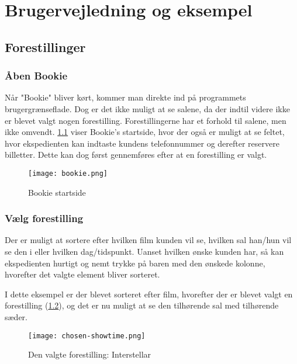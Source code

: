 \chapter{Brugervejledning og eksempel}

\section{Forestillinger}

\subsection{Åben Bookie}

Når "Bookie" bliver kørt, kommer man direkte ind på programmets brugergrænseflade. Dog er det ikke muligt at se salene, da der indtil videre ikke er blevet valgt nogen forestilling. Forestillingerne har et forhold til salene, men ikke omvendt. \ref{screenshot: bookie} viser Bookie's startside, hvor der også er muligt at se feltet, hvor ekspedienten kan indtaste kundens telefonnummer og derefter reservere billetter. Dette kan dog først gennemføres efter at en forestilling er valgt. 

\begin{figure}[h]
  \centering
  \texttt{[image: bookie.png]}
  \caption{Bookie startside}
  \label{screenshot: bookie}
\end{figure}

\subsection{Vælg forestilling}

Der er muligt at sortere efter hvilken film kunden vil se, hvilken sal han/hun vil se den i eller hvilken dag/tidspunkt. Uanset hvilken ønske kunden har, så kan ekspedienten hurtigt og nemt trykke på baren med den ønskede kolonne, hvorefter det valgte element bliver sorteret.

I dette eksempel er der blevet sorteret efter film, hvorefter der er blevet valgt en forestilling (\ref{screenshot: chosen-showtime}), og det er nu muligt at se den tilhørende sal med tilhørende sæder.

\begin{figure} [h]
  \centering
  \texttt{[image: chosen-showtime.png]}
  \caption{Den valgte forestilling: Interstellar}
  \label{screenshot: chosen-showtime}
\end{figure}

\newpage

